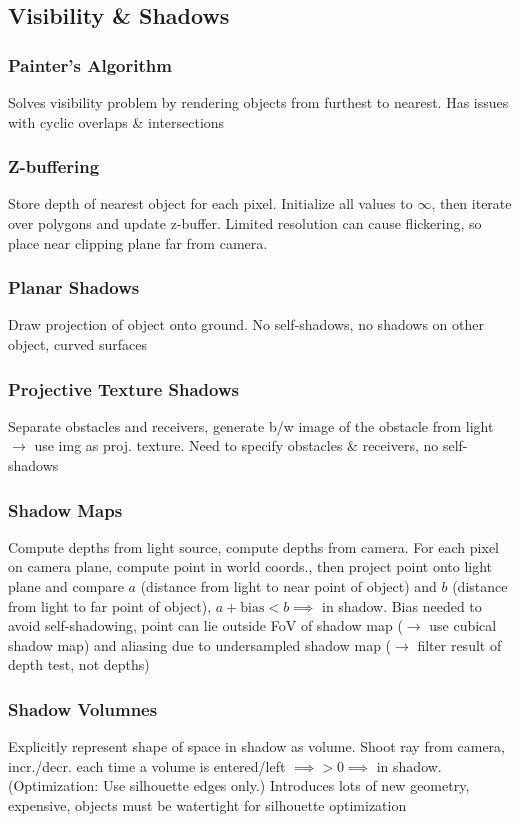 \documentclass[a4paper,10pt]{article}
\begin{document}
\subsection{Visibility \& Shadows}
\subsubsection{Painter's Algorithm} Solves visibility problem by rendering objects from furthest to nearest. Has issues with cyclic overlaps \& intersections
\subsubsection{Z-buffering} Store depth of nearest object for each pixel. Initialize all values to \( \infty \), then iterate over polygons and update z-buffer.
Limited resolution can cause flickering, so place near clipping plane far from camera.

\subsubsection{Planar Shadows} Draw projection of object onto ground. No self-shadows, no shadows on other object, curved surfaces
\subsubsection{Projective Texture Shadows} Separate obstacles and receivers, generate b/w image of the obstacle from light \( \to  \) use img as proj. texture. Need to specify obstacles \& receivers, no self-shadows
\subsubsection{Shadow Maps} Compute depths from light source, compute depths from camera. For each pixel on camera plane, compute point in world coords., then project point onto light plane and compare \( a \) (distance from light to near point of object) and \( b \) (distance from light to far point of object), \( a + \text{bias} < b \implies \) in shadow. Bias needed to avoid self-shadowing, point can lie outside FoV of shadow map (\( \to \) use cubical shadow map) and aliasing due to undersampled shadow map (\( \to  \) filter result of depth test, not depths)

\subsubsection{Shadow Volumnes} Explicitly represent shape of space in shadow as volume. Shoot ray from camera, incr./decr. each time a volume is entered/left \( \implies > 0 \implies \) in shadow. (Optimization: Use silhouette edges only.) Introduces lots of new geometry, expensive, objects must be watertight for silhouette optimization
\end{document}
